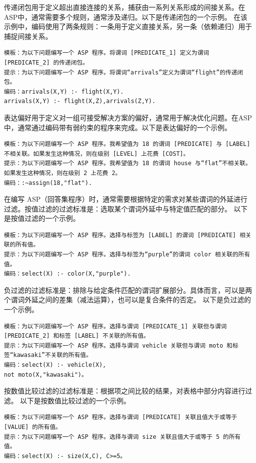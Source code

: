 传递闭包用于定义超出直接连接的关系，捕获由一系列关系形成的间接关系。在ASP中，通常需要多个规则，通常涉及递归。以下是传递闭包的一个示例。
在该示例中，编码使用了两条规则：一条用于定义直接关系，另一条（依赖递归）用于捕捉间接关系。
\begin{lstlisting}
模板：为以下问题编写一个 ASP 程序。将谓词 [PREDICATE_1] 定义为谓词 [PREDICATE_2] 的传递闭包。
提示：为以下问题编写一个 ASP 程序。将谓词“arrivals”定义为谓词“flight”的传递闭包。
编码：arrivals(X,Y) :- flight(X,Y).
arrivals(X,Y) :- flight(X,Z),arrivals(Z,Y).
\end{lstlisting}

表达偏好用于定义对一组可接受解决方案的偏好，通常用于解决优化问题。在ASP中，通常通过编码带有弱约束的程序来完成。以下是表达偏好的一个示例。
\begin{lstlisting}
模板：为以下问题编写一个 ASP 程序。我希望值为 18 的谓词 [PREDICATE] 与 [LABEL] 不相关联。如果发生这种情况，则在级别 [LEVEL] 上花费 [COST]。
提示：为以下问题编写一个 ASP 程序。我希望值为 18 的谓词 house 与“flat”不相关联。如果发生这种情况，则在级别 2 上花费 2。
编码：:∼assign(18,"flat").
\end{lstlisting}

在编写 ASP（回答集程序）时，通常需要根据特定的需求对某些谓词的外延进行过滤。按值过滤的过滤标准是：选取某个谓词外延中与特定值匹配的部分。
以下是按值过滤的一个示例。
\begin{lstlisting}
模板：为以下问题编写一个 ASP 程序。选择与标签为 [LABEL] 的谓词 [PREDICATE] 相关联的所有值。
提示：为以下问题编写一个 ASP 程序。选择与标签为“purple”的谓词 color 相关联的所有值。
编码：select(X) :- color(X,"purple").
\end{lstlisting}

负过滤的过滤标准是：排除与给定条件匹配的谓词扩展部分。具体而言，可以是两个谓词外延之间的差集（减法运算），也可以是复合条件的否定。
以下是负过滤的一个示例。
\begin{lstlisting}
模板：为以下问题编写一个 ASP 程序。选择与谓词 [PREDICATE_1] 关联但与谓词 [PREDICATE_2] 和标签 [LABEL] 不关联的所有值。
提示：为以下问题编写一个 ASP 程序。选择与谓词 vehicle 关联但与谓词 moto 和标签“kawasaki”不关联的所有值。
编码：select(X) :- vehicle(X),
not moto(X,"kawasaki")。
\end{lstlisting}

按数值比较过滤的过滤标准是：根据项之间比较的结果，对表格中部分内容进行过滤。
以下是按数值比较过滤的一个示例。
\begin{lstlisting}
模板：为以下问题编写一个 ASP 程序。选择与谓词 [PREDICATE] 关联且值大于或等于 [VALUE] 的所有值。
提示：为以下问题编写一个 ASP 程序。选择与谓词 size 关联且值大于或等于 5 的所有值。
编码：select(X) :- size(X,C), C>=5。
\end{lstlisting}

